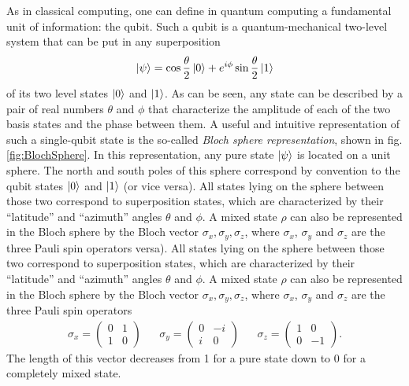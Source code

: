 As in classical computing, one can define in quantum computing a fundamental unit of information: the qubit. Such a qubit is a quantum-mechanical two-level system that can be put in any superposition
%
\begin{equation}
\left| \psi \right> = \cos{\frac{\theta}{2}}\left| 0 \right>+e^{i\phi}\sin{\frac{\theta}{2}}\left| 1 \right>
\end{equation}
%
of its two level states $\left| 0 \right>$ and $\left| 1 \right>$.
As can be seen, any state can be described by a pair of real numbers $\theta$ and $\phi$ that characterize the amplitude of each of the two basis states and the phase between them. A useful and intuitive representation of such a single-qubit state is the so-called {\it Bloch sphere representation}, shown in fig. \ref{fig:BlochSphere}. In this representation, any pure state $\left| \psi \right>$ is located on a unit sphere. The north and south poles of this sphere correspond by convention to the qubit states $\left| 0 \right>$ and $\left| 1 \right>$ (or vice versa). All states lying on the sphere between those two correspond to superposition states, which are characterized by their ``latitude'' and ``azimuth'' angles $\theta$ and $\phi$. A mixed state $\rho$ can also be represented in the Bloch sphere by the Bloch vector ${\sigma_x,\sigma_y,\sigma_z}$, where $\sigma_x$, $\sigma_y$ and $\sigma_z$ are the three Pauli spin operators
 versa). All states lying on the sphere between those two correspond to superposition states, which are characterized by their ``latitude'' and ``azimuth'' angles $\theta$ and $\phi$. A mixed state $\rho$ can also be represented in the Bloch sphere by the Bloch vector ${\sigma_x,\sigma_y,\sigma_z}$, where $\sigma_x$, $\sigma_y$ and $\sigma_z$ are the three Pauli spin operators
%
\begin{align}
  \sigma_x  =  \left( \begin{array}{cc} 0 & 1 \\ 1 & 0 \end{array} \right)
  & & \sigma_y  =  \left( \begin{array}{cc} 0 & -i \\ i  &  0\end{array} \right)
  & & \sigma_z  =  \left( \begin{array}{cc} 1 & 0 \\ 0 & -1 \end{array} \right).
\label{eq:pauli_operators}
\end{align}
% 
The length of this vector decreases from 1 for a pure state down to 0 for a completely mixed state.

